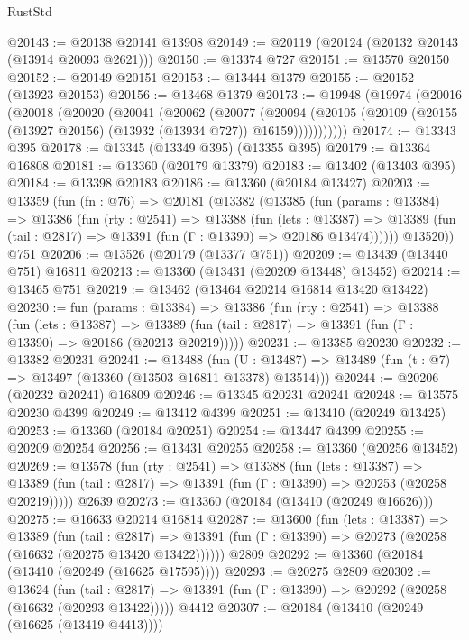 \begin{lexlean}{RustStd}
\begin{coremodule}
@20143 := @20138 @20141 @13908
@20149 := @20119 (@20124 (@20132 @20143 (@13914 @20093 @2621)))
@20150 := @13374 @727
@20151 := @13570 @20150
@20152 := @20149 @20151
@20153 := @13444 @1379
@20155 := @20152 (@13923 @20153)
@20156 := @13468 @1379
@20173 := @19948
    (@19974
      (@20016
        (@20018
          (@20020
            (@20041
              (@20062
                (@20077
                  (@20094
                    (@20105 (@20109 (@20155 (@13927 @20156) (@13932 (@13934 @727)) @16159)))))))))))
@20174 := @13343 @395
@20178 := @13345 (@13349 @395) (@13355 @395)
@20179 := @13364 @16808
@20181 := @13360 (@20179 @13379)
@20183 := @13402 (@13403 @395)
@20184 := @13398 @20183
@20186 := @13360 (@20184 @13427)
@20203 := @13359
    (fun (fn : @76) =>
    @20181
      (@13382
        (@13385
          (fun (params : @13384) =>
          @13386
            (fun (rty : @2541) =>
            @13388
              (fun (lets : @13387) =>
              @13389 (fun (tail : @2817) => @13391 (fun (Γ : @13390) => @20186 @13474))))))
        @13520))
    @751
@20206 := @13526 (@20179 (@13377 @751))
@20209 := @13439 (@13440 @751) @16811
@20213 := @13360 (@13431 (@20209 @13448) @13452)
@20214 := @13465 @751
@20219 := @13462 (@13464 @20214 @16814 @13420 @13422)
@20230 := fun (params : @13384) =>
  @13386
    (fun (rty : @2541) =>
    @13388
      (fun (lets : @13387) =>
      @13389 (fun (tail : @2817) => @13391 (fun (Γ : @13390) => @20186 (@20213 @20219)))))
@20231 := @13385 @20230
@20232 := @13382 @20231
@20241 := @13488
    (fun (U : @13487) => @13489 (fun (t : @7) => @13497 (@13360 (@13503 @16811 @13378) @13514)))
@20244 := @20206 (@20232 @20241) @16809
@20246 := @13345 @20231 @20241
@20248 := @13575 @20230 @4399
@20249 := @13412 @4399
@20251 := @13410 (@20249 @13425)
@20253 := @13360 (@20184 @20251)
@20254 := @13447 @4399
@20255 := @20209 @20254
@20256 := @13431 @20255
@20258 := @13360 (@20256 @13452)
@20269 := @13578
    (fun (rty : @2541) =>
    @13388
      (fun (lets : @13387) =>
      @13389 (fun (tail : @2817) => @13391 (fun (Γ : @13390) => @20253 (@20258 @20219)))))
    @2639
@20273 := @13360 (@20184 (@13410 (@20249 @16626)))
@20275 := @16633 @20214 @16814
@20287 := @13600
    (fun (lets : @13387) =>
    @13389
      (fun (tail : @2817) =>
      @13391 (fun (Γ : @13390) => @20273 (@20258 (@16632 (@20275 @13420 @13422))))))
    @2809
@20292 := @13360 (@20184 (@13410 (@20249 (@16625 @17595))))
@20293 := @20275 @2809
@20302 := @13624
    (fun (tail : @2817) => @13391 (fun (Γ : @13390) => @20292 (@20258 (@16632 (@20293 @13422)))))
    @4412
@20307 := @20184 (@13410 (@20249 (@16625 (@13419 @4413))))

\end{coremodule}
\end{lexlean}
